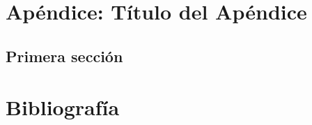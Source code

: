 \documentclass[12pt,a4paper,oneside,]{book}
\def\ifdoblecara{} %
\let\ifdoblecara\undefined %
\def\ifcitapandoc{} %
\let\ifcitapandoc\undefined %
\numberwithin{dummy}{section}
\theoremstyle{ocrenumbox}
\theoremstyle{blacknumex}
\theoremstyle{blacknumbox}
\theoremstyle{ocrenum}
\theoremstyle{ocrenum}
\begin{document}
\nocite{Luque2017,Luque2019,RStudio,R-base2,
R-knitr,R-rmarkdown,R-dplyr,R-ggplot2,Techopedia}

\fi

\ifdefined\ifdoblecara
\fancyhead{}{}
\fancyhead[LE,RO]{\scriptsize\rightmark}
\fancyfoot[LO,RE]{\scriptsize\slshape \leftmark}
\fancyfoot[C]{}
\fancyfoot[LE,RO]{\footnotesize\thepage}
\else
\fancyhead{}{}
\fancyhead[RO]{\scriptsize\rightmark}
\fancyfoot[LO]{\scriptsize\slshape \leftmark}
\fancyfoot[C]{}
\fancyfoot[RO]{\footnotesize\thepage}
\fi

\renewcommand{\headrulewidth}{0.4pt}
\renewcommand{\footrulewidth}{0.4pt}

\hypertarget{apuxe9ndice-tuxedtulo-del-apuxe9ndice-1}{%
\chapter{Apéndice: Título del
Apéndice}\label{apuxe9ndice-tuxedtulo-del-apuxe9ndice-1}}

\hypertarget{primera-secciuxf3n-5}{%
\section{Primera sección}\label{primera-secciuxf3n-5}}

\FloatBarrier
\cleardoublepage

\ifdefined\ifdoblecara
  \fancyhead[LE,RO]{}
  \fancyfoot[LO,RE]{}
\else
  \fancyhead[RO]{}
  \fancyfoot[LO]{}
\fi

\ifdefined\ifcitapandoc

\hypertarget{bibliografuxeda}{%
\chapter*{Bibliografía}\label{bibliografuxeda}}

\else

\nocite{Luque2017,Luque2019,RStudio,R-base2,
R-knitr,R-rmarkdown,R-dplyr,R-ggplot2,Techopedia,
webfacmatematicasus1,webUS2a,webPedroLuque,
lopez2007aplicacion}

\fi




%
\end{document}
